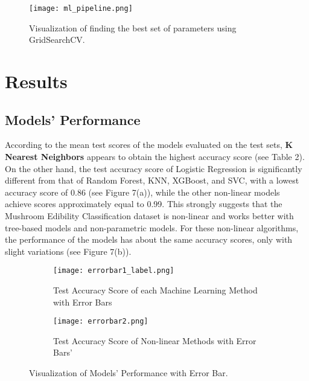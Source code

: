 \documentclass{article}
\begin{document}
\begin{figure}[h]
\centering
\texttt{[image: ml\_pipeline.png]}
\caption{\label{fig:frog} Visualization of finding the best set of parameters using GridSearchCV.}
\end{figure}

\section{Results}

\subsection{Models' Performance}
\hspace{0.5cm} According to the mean test scores of the models evaluated on the test sets, \textbf{K Nearest Neighbors} appears to obtain the highest accuracy score (see Table 2). On the other hand, the test accuracy score of Logistic Regression is significantly different from that of Random Forest, KNN, XGBoost, and SVC, with a lowest accuracy score of 0.86 (see Figure 7(a)), while the other non-linear models achieve scores approximately equal to 0.99. This strongly suggests that the Mushroom Edibility Classification dataset is non-linear and works better with tree-based models and non-parametric models. For these non-linear algorithms, the performance of the models has about the same accuracy scores, only with slight variations (see Figure 7(b)).

\begin{figure}[h]
    \centering
    \begin{subfigure}{0.46\textwidth}
        \texttt{[image: errorbar1\_label.png]}
        \caption{Test Accuracy Score of each Machine Learning Method with Error Bars}
        \label{fig:subfig1}
    \end{subfigure}
    \hfill
    \begin{subfigure}{0.46\textwidth}
        \texttt{[image: errorbar2.png]}
        \caption{Test Accuracy Score of Non-linear Methods with Error Bars'}
        \label{fig:subfig2}
    \end{subfigure}
    \caption{Visualization of Models' Performance with Error Bar.}
    \label{fig:both}
\end{figure}
\end{document}
